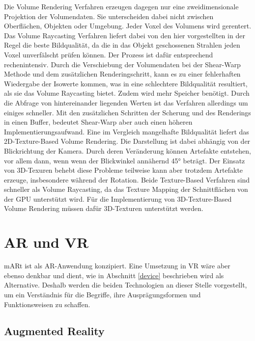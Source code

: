 Die Volume Rendering Verfahren erzeugen dagegen nur eine zweidimensionale Projektion der Volumendaten. Sie unterscheiden dabei nicht zwischen Oberflächen, Objekten oder Umgebung. Jeder Voxel des Volumens wird gerentert. 
Das Volume Raycasting Verfahren liefert dabei von den hier vorgestellten in der Regel die beste Bildqualität, da die in das Objekt geschossenen Strahlen jeden Voxel unverfälscht prüfen können. Der Prozess ist dafür entsprechend rechenintensiv.
Durch die Verschiebung der Volumendaten bei der Shear-Warp Methode und dem zusätzlichen Renderingschritt, kann es zu einer fehlerhaften Wiedergabe der Isowerte kommen, was in eine schlechtere Bildqualität resultiert, als sie das Volume Raycasting bietet. Zudem wird mehr Speicher benötigt. Durch die Abfrage von hintereinander liegenden Werten ist das Verfahren allerdings um einiges schneller. Mit den zusätzlichen Schritten der Scherung und des Renderings in einen Buffer, bedeutet Shear-Warp aber auch einen höheren Implementierungsaufwand.
Eine im Vergleich mangelhafte Bildqualität liefert das 2D-Texture-Based Volume Rendering. Die Darstellung ist dabei abhängig von der Blickrichtung der Kamera. Durch deren Veränderung können Artefakte entstehen, vor allem dann, wenn wenn der Blickwinkel annähernd 45° beträgt.
Der Einsatz von 3D-Texuren behebt diese Probleme teilweise kann aber trotzdem Artefakte erzeuge, insbesondere während der Rotation.
Beide Texture-Based Verfahren sind schneller als Volume Raycasting, da das Texture Mapping der Schnittflächen von der GPU unterstützt wird. Für die Implementierung von 3D-Texture-Based Volume Rendering  müssen dafür 3D-Texturen unterstützt werden. 



\section{AR und VR}		
\label{arVr}							 %

mARt ist als AR-Anwendung konzipiert. Eine Umsetzung in VR wäre aber ebenso denkbar und dient, wie in Abschnitt \ref{device} beschrieben wird als Alternative.
Deshalb werden die beiden Technologien an dieser Stelle vorgestellt, um ein Verständnis für die Begriffe, ihre Ausprägungsformen und Funktionsweisen zu schaffen.

\subsection{Augmented Reality}


